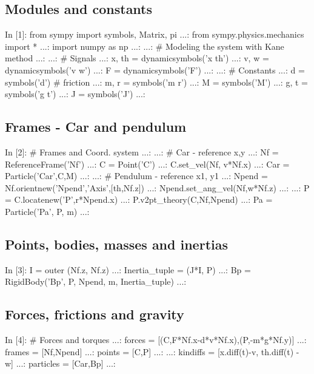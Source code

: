 \subsection{Modules and constants}
\begin{code}
In [1]: from sympy import symbols, Matrix, pi
   ...: from sympy.physics.mechanics import *
   ...: import numpy as np
   ...: 
   ...: # Modeling the system with Kane method
   ...: 
   ...: # Signals
   ...: x, th  = dynamicsymbols('x th')
   ...: v, w = dynamicsymbols('v w')
   ...: F = dynamicsymbols('F')
  ...: 
   ...: # Constants
   ...: d = symbols('d') # friction
   ...: m, r = symbols('m r')
   ...: M = symbols('M')
   ...: g, t = symbols('g t')
   ...: J = symbols('J')
   ...: 
\end{code}

\subsection{Frames - Car and pendulum}
\begin{code}
In [2]: # Frames and Coord. system
   ...: 
   ...: # Car - reference x,y
   ...: Nf = ReferenceFrame('Nf')
   ...: C = Point('C')                         
   ...: C.set_vel(Nf, v*Nf.x)
   ...: Car = Particle('Car',C,M)
   ...: 
   ...: # Pendulum - reference x1, y1
   ...: Npend = Nf.orientnew('Npend','Axis',[th,Nf.z])
   ...: Npend.set_ang_vel(Nf,w*Nf.z)
   ...: 
   ...: P = C.locatenew('P',r*Npend.x)
   ...: P.v2pt_theory(C,Nf,Npend)
   ...: Pa = Particle('Pa', P, m)
   ...: 
\end{code}

\subsection{Points, bodies, masses and inertias}
\begin{code}
In [3]: I = outer (Nf.z, Nf.z)
   ...: Inertia_tuple = (J*I, P)
   ...: Bp = RigidBody('Bp', P, Npend, m, Inertia_tuple)
   ...: 
\end{code}

\subsection{Forces, frictions and gravity}
\begin{code}
In [4]: # Forces and torques
   ...: forces = [(C,F*Nf.x-d*v*Nf.x),(P,-m*g*Nf.y)]
   ...: frames = [Nf,Npend]
   ...: points = [C,P]
   ...: 
   ...: kindiffs = [x.diff(t)-v, th.diff(t) - w]
   ...: particles = [Car,Bp]
   ...: 
\end{code}

